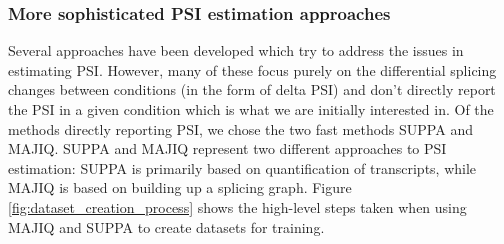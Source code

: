 



\subsubsection{More sophisticated PSI estimation approaches}

Several approaches have been developed which try to address the issues in estimating PSI. However, many of these focus purely on the differential splicing changes between conditions (in the form of delta PSI) and don't directly report the PSI in a given condition which is what we are initially interested in. Of the methods directly reporting PSI, we chose the two fast methods SUPPA and MAJIQ. SUPPA and MAJIQ represent two different approaches to PSI estimation: SUPPA is primarily based on quantification of transcripts, while MAJIQ is based on building up a splicing graph. Figure \ref{fig:dataset_creation_process} shows the high-level steps taken when using MAJIQ and SUPPA to create datasets for training.



